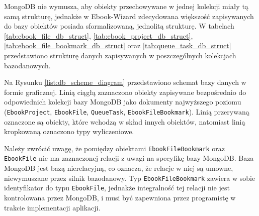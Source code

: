 MongoDB nie wymusza, aby obiekty przechowywane w jednej kolekcji miały tą samą strukturę, \cite{mongodb_book} jednakże w Ebook-Wizard zdecydowana większość zapisywanych do bazy obiektów posiada sformalizowaną, jednolitą strukturę. W tabelach \ref{tab:ebook_file_db_struct}, \ref{tab:ebook_project_db_struct}, \ref{tab:ebook_file_bookmark_db_struct} oraz \ref{tab:queue_task_db_struct} przedstawiono strukturę danych zapisywanych w poszczególnych kolekcjach bazodanowych.

Na Rysunku \ref{list:db_scheme_diagram} przedstawiono schemat bazy danych w formie graficznej. Linią ciągłą zaznaczono obiekty zapisywane bezpośrednio do odpowiednich kolekcji bazy MongoDB jako dokumenty najwyższego poziomu (\verb|EbookProject|, \verb|EbookFile|, \verb|QueueTask|, \verb|EbookFileBookmark|). Linią przerywaną oznaczone są obiekty, które wchodzą w skład innych obiektów, natomiast linią kropkowaną oznaczono typy wyliczeniowe.

Należy zwrócić uwagę, że pomiędzy obiektami \verb|EbookFileBookmark| oraz \verb|EbookFile| nie ma zaznaczonej relacji z uwagi na specyfikę bazy MongoDB. Baza MongoDB jest bazą nierelacyjną, co oznacza, że relacje w niej są umowne, niewymuszane przez silnik bazodanowy. Typ \verb|EbookFileBookmark| zawiera w sobie identyfikator do typu \verb|EbookFile|, jednakże integralność tej relacji nie jest kontrolowana przez MongoDB, i musi być zapewniona przez programistę w trakcie implementacji aplikacji. \cite{mongodb_book}

